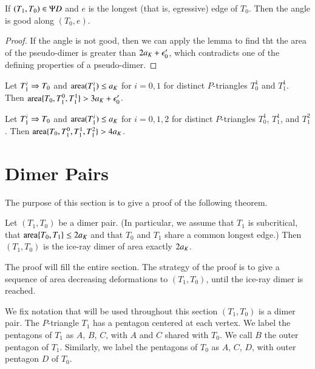 \begin{corollary} If $(T_1,T_0)\in \Psi D$ and $e$ is the longest (that is, egressive) edge of $T_0$.  Then the angle
is good along $(T_0,e)$.
\end{corollary}

\begin{proof} If the angle is not good, then we can apply the lemma to find tht the area of the pseudo-dimer is
greater than $2a_K + \epsilon_0'$, which contradicts one of the defining properties of a pseudo-dimer.
\end{proof}


\begin{lemma}
Let $T_1^i\Rightarrow T_0$ and ${\operatorname{area}}(T_1^i)\le a_K$ for $i=0,1$ for distinct $P$-triangles $T^1_0$ and $T^1_1$.
Then ${\operatorname{area}}\{T_0,T^0_1,T^1_1\} > 3a_K + \epsilon_0'$.
\end{lemma}


\begin{lemma}
Let $T_1^i\Rightarrow T_0$ and ${\operatorname{area}}(T_1^i)\le a_K$ for $i=0,1,2$ for distinct $P$-triangles $T^1_0$, $T^1_1$, and $T^2_1$.
Then ${\operatorname{area}}\{T_0,T^0_1,T^1_1,T^2_1\} > 4a_K$.
\end{lemma}


\section{Dimer Pairs}

The purpose of this section is to give a proof of the following theorem.  


\begin{theorem}
Let $(T_1,T_0)$ be a dimer pair.  (In particular, we assume that $T_1$ is subcritical,
that ${\operatorname{area}}\{T_0,T_1\}\le 2a_K$ and that $T_0$ and $T_1$ share a common longest edge.)
Then $(T_1,T_0)$ is the ice-ray dimer of area exactly $2a_K$.
\end{theorem}

The proof will fill the entire section.
 The strategy
of the proof is to give a sequence of area decreasing deformations to $(T_1,T_0)$,
until the ice-ray dimer is reached.

We fix notation that will be used throughout this section $(T_1,T_0)$ is a dimer pair.
The $P$-triangle $T_1$ has a pentagon centered at each vertex.  We label the pentagons of $T_1$ as
$A$, $B$, $C$, with $A$ and $C$ shared with $T_0$.  We call $B$ the outer pentagon of $T_1$.
Similarly, we label the pentagons of $T_0$ as $A$, $C$, $D$, with outer pentagon $D$ of $T_0$.


